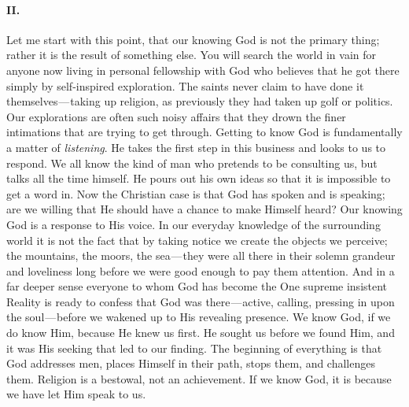 \documentclass[12pt]{article}
\begin{document}
\paragraph{II.}\label{813d}

Let me start with this point, that our knowing God is not the primary
thing; rather it is the result of something else. You will search the
world in vain for anyone now living in personal fellowship with God who
believes that he got there simply by self-inspired exploration. The
saints never claim to have done it themselves --- taking up religion, as
previously they had taken up golf or politics. Our explorations are
often such noisy affairs that they drown the finer intimations that are
trying to get through. Getting to know God is fundamentally a matter of
\emph{listening}. He takes the first step in this business and looks to
us to respond. We all know the kind of man who pretends to be consulting
us, but talks all the time himself. He pours out his own ideas so that
it is impossible to get a word in. Now the Christian case is that God
has spoken and is speaking; are we willing that He should have a chance
to make Himself heard? Our knowing God is a response to His voice. In
our everyday knowledge of the surrounding world it is not the fact that
by taking notice we create the objects we perceive; the mountains, the
moors, the sea --- they were all there in their solemn grandeur and
loveliness long before we were good enough to pay them attention. And in
a far deeper sense everyone to whom God has become the One supreme
insistent Reality is ready to confess that God was there --- active,
calling, pressing in upon the soul --- before we wakened up to His
revealing presence. We know God, if we do know Him, because He knew us
first. He sought us before we found Him, and it was His seeking that led
to our finding. The beginning of everything is that God addresses men,
places Himself in their path, stops them, and challenges them. Religion
is a bestowal, not an achievement. If we know God, it is because we have
let Him speak to us.
\end{document}
